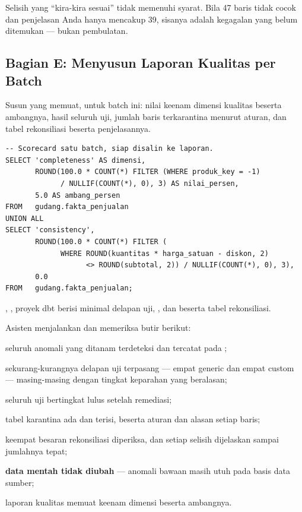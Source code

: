 \begin{peringatan}
Selisih yang ``kira-kira sesuai'' tidak memenuhi syarat. Bila 47 baris tidak
cocok dan penjelasan Anda hanya mencakup 39, sisanya adalah kegagalan yang
belum ditemukan --- bukan pembulatan.
\end{peringatan}

\subsection{Bagian E: Menyusun Laporan Kualitas per Batch}


Susun  yang memuat, untuk batch ini: nilai keenam
dimensi kualitas beserta ambangnya, hasil seluruh uji, jumlah baris
terkarantina menurut aturan, dan tabel rekonsiliasi beserta penjelasannya.

\begin{lstlisting}[style=sqlgaya]
-- Scorecard satu batch, siap disalin ke laporan.
SELECT 'completeness' AS dimensi,
       ROUND(100.0 * COUNT(*) FILTER (WHERE produk_key = -1)
             / NULLIF(COUNT(*), 0), 3) AS nilai_persen,
       5.0 AS ambang_persen
FROM   gudang.fakta_penjualan
UNION ALL
SELECT 'consistency',
       ROUND(100.0 * COUNT(*) FILTER (
             WHERE ROUND(kuantitas * harga_satuan - diskon, 2)
                   <> ROUND(subtotal, 2)) / NULLIF(COUNT(*), 0), 3),
       0.0
FROM   gudang.fakta_penjualan;
\end{lstlisting}

\begin{luaran}
,
, proyek dbt berisi minimal delapan uji,
, dan  beserta tabel
rekonsiliasi.
\end{luaran}

\begin{checkpoint}
Asisten menjalankan  dan memeriksa butir berikut:
\begin{ceklis}
  \item seluruh anomali yang ditanam terdeteksi dan tercatat pada
        ;
  \item sekurang-kurangnya delapan uji terpasang --- empat generic dan empat
        custom --- masing-masing dengan tingkat keparahan yang beralasan;
  \item seluruh uji bertingkat  lulus setelah remediasi;
  \item tabel karantina ada dan terisi, beserta aturan dan alasan setiap baris;
  \item keempat besaran rekonsiliasi diperiksa, dan setiap selisih dijelaskan
        sampai jumlahnya tepat;
  \item \textbf{data mentah tidak diubah} --- anomali bawaan masih utuh pada
        basis data sumber;
  \item laporan kualitas memuat keenam dimensi beserta ambangnya.
\end{ceklis}
\end{checkpoint}

